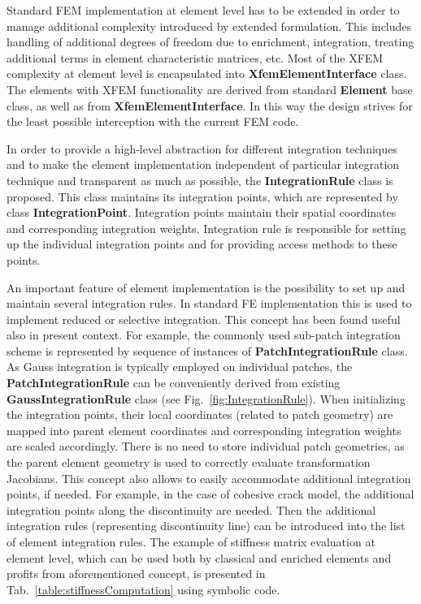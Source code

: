 \documentclass[a4paper]{article}
\newcommand{\class}[1]{{\bf #1}}
\begin{document}
Standard FEM implementation at element level has to be extended in order to manage additional complexity introduced by extended formulation. This includes handling of additional degrees of freedom due to enrichment, integration, treating additional terms in element characteristic matrices, etc. Most of the XFEM complexity at element level is encapsulated into \class{XfemElementInterface} class. The elements with XFEM functionality are derived from standard \class{Element} base class, as well as from \class{XfemElementInterface}. In this way the design strives for the least possible interception with the current FEM code.

In order to provide a high-level abstraction for different integration techniques and to make the element implementation independent of particular integration technique and transparent as much as possible, the \class{IntegrationRule} class is proposed. This class maintains its integration points, which are represented by class \class{IntegrationPoint}. Integration points maintain their spatial coordinates and corresponding integration weights. Integration rule is responsible for setting up the individual integration points and for providing access methods to these points. 

An important feature of element implementation is the possibility to set up and maintain several integration rules. In standard FE implementation this is used to implement reduced or selective integration. This concept has been found useful also in present context. For example, 
the commonly used sub-patch integration scheme is represented by sequence of instances of \class{PatchIntegrationRule} class. As Gauss integration is typically employed on individual patches, the \class{PatchIntegrationRule} can be conveniently derived from existing \class{GaussIntegrationRule} class (see Fig.~\ref{fig:IntegrationRule}). When initializing the integration points, their local coordinates (related to patch geometry) are mapped into parent element coordinates and corresponding integration weights are scaled accordingly. There is no need to store individual patch geometries, as the parent element geometry is used to correctly evaluate transformation Jacobians. This concept also allows to easily accommodate additional integration points, if needed. For example, in the case of cohesive crack model, the additional integration points along the discontinuity are needed. Then the additional integration rules (representing discontinuity line) can be introduced into the list of element integration rules. The example of stiffness matrix evaluation at element level, which can be used both by classical and enriched elements and profits from aforementioned concept, is presented in Tab.~\ref{table:stiffnessComputation} using symbolic code. 
\end{document}
